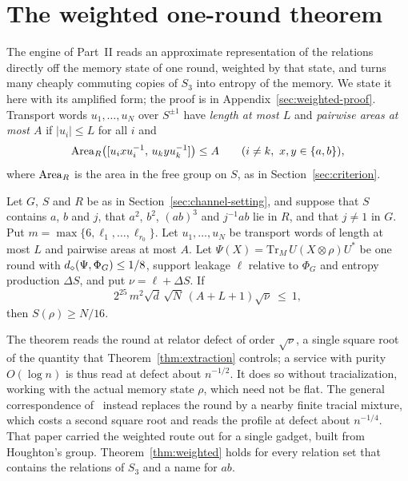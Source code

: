 \section{The weighted one-round theorem}\label{sec:weighted-statement}

The engine of Part~II reads an approximate representation of the relations directly off the memory state of one round, weighted by that
state, and turns many cheaply commuting copies of $S_3$ into entropy of the memory. We state it here with its amplified form; the proof is in
Appendix~\ref{sec:weighted-proof}. Transport words $u_1,\dots,u_N$ over $S^{\pm1}$ have \emph{length at most $L$} and \emph{pairwise areas at
most $A$} if $|u_i|\le L$ for all $i$ and
\[
\operatorname{Area}_R\bigl([u_ixu_i^{-1},\,u_kyu_k^{-1}]\bigr)\le A\qquad(i\ne k,\ x,y\in\{a,b\}),
\]
where $\operatorname{Area}_R$ is the area in the free group on $S$, as in Section~\ref{sec:criterion}.

\begin{theorem}\label{thm:weighted}
Let $G$, $S$ and $R$ be as in Section~\ref{sec:channel-setting}, and suppose that $S$ contains $a$, $b$ and $j$, that $a^2$, $b^2$, $(ab)^3$ and
$j^{-1}ab$ lie in $R$, and that $j\ne1$ in $G$. Put $m=\max\{6,\ell_1,\dots,\ell_{r_0}\}$. Let $u_1,\dots,u_N$ be transport words of length at
most $L$ and pairwise areas at most $A$. Let $\Psi(X)=\mathrm{Tr}_M\,U(X\otimes\rho)U^*$ be one round with $d_\diamond(\Psi,\Phi_G)\le1/8$, support
leakage $\ell$ relative to $\Phi_G$ and entropy production $\Delta S$, and put $\nu=\ell+\Delta S$. If
\begin{equation}\label{eq:weighted-condition}
2^{25}\,m^2\sqrt d\,\sqrt N\,(A+L+1)\sqrt\nu\ \le\ 1,
\end{equation}
then $S(\rho)\ge N/16$.
\end{theorem}

The theorem reads the round at relator defect of order $\sqrt\nu$, a single square root of the quantity that Theorem~\ref{thm:extraction}
controls; a service with purity $O(\log n)$ is thus read at defect about $n^{-1/2}$. It does so without tracialization, working with the
actual memory state $\rho$, which need not be flat. The general correspondence of~\cite{DouglasMghirbiB} instead replaces the round by a nearby
finite tracial mixture, which costs a second square root and reads the profile at defect about $n^{-1/4}$. That paper carried the weighted
route out for a single gadget, built from Houghton's group. Theorem~\ref{thm:weighted} holds for every relation set that contains the
relations of $S_3$ and a name for $ab$.

